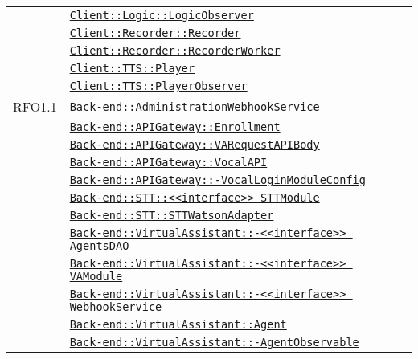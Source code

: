 \begin{longtable}{|>{\centering}m{3cm}|m{10cm}<{\centering}|}
& \hyperref[Client::Logic::LogicObserver]{\texttt{Client::Logic::LogicObserver}}\\
& \hyperref[Client::Recorder::Recorder]{\texttt{Client::Recorder::Recorder}}\\
& \hyperref[Client::Recorder::RecorderWorker]{\texttt{Client::Recorder::RecorderWorker}}\\
& \hyperref[Client::TTS::Player]{\texttt{Client::TTS::Player}}\\
& \hyperref[Client::TTS::PlayerObserver]{\texttt{Client::TTS::PlayerObserver}}\\ \hline

RFO1.1 & \hyperref[Back-end::AdministrationWebhookService]{\texttt{Back-end::AdministrationWebhookService}}\\
& \hyperref[Back-end::APIGateway::Enrollment]{\texttt{Back-end::APIGateway::Enrollment}}\\
& \hyperref[Back-end::APIGateway::VARequestAPIBody]{\texttt{Back-end::APIGateway::VARequestAPIBody}}\\
& \hyperref[Back-end::APIGateway::VocalAPI]{\texttt{Back-end::APIGateway::VocalAPI}}\\
& \hyperref[Back-end::APIGateway::VocalLoginModuleConfig]{\texttt{Back-end::APIGateway::-\linebreak VocalLoginModuleConfig}}\\
& \hyperref[Back-end::STT::<<interface>> STTModule]{\texttt{Back-end::STT::<<interface>> STTModule}}\\
& \hyperref[Back-end::STT::STTWatsonAdapter]{\texttt{Back-end::STT::STTWatsonAdapter}}\\
& \hyperref[Back-end::VirtualAssistant::<<interface>> AgentsDAO]{\texttt{Back-end::VirtualAssistant::-\linebreak <<interface>> AgentsDAO}}\\
& \hyperref[Back-end::VirtualAssistant::<<interface>> VAModule]{\texttt{Back-end::VirtualAssistant::-\linebreak <<interface>> VAModule}}\\
& \hyperref[Back-end::VirtualAssistant::<<interface>> WebhookService]{\texttt{Back-end::VirtualAssistant::-\linebreak <<interface>> WebhookService}}\\
& \hyperref[Back-end::VirtualAssistant::Agent]{\texttt{Back-end::VirtualAssistant::Agent}}\\
& \hyperref[Back-end::VirtualAssistant::AgentObservable]{\texttt{Back-end::VirtualAssistant::-\linebreak AgentObservable}}\\

\end{longtable}

